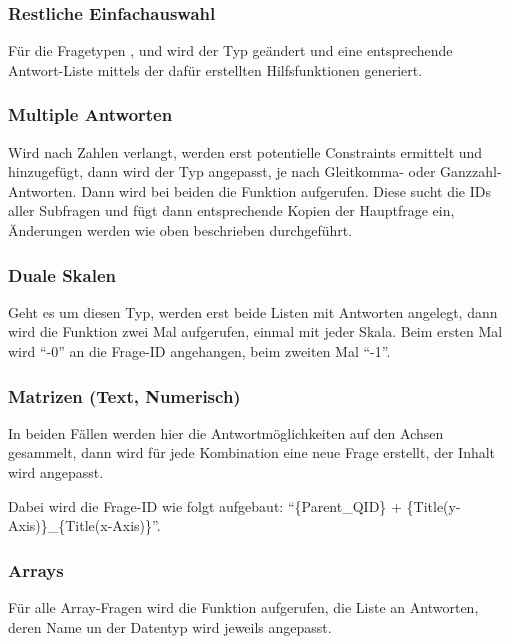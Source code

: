\subsubsection{Restliche Einfachauswahl}
Für die Fragetypen ,  und  wird der Typ geändert und eine entsprechende Antwort-Liste mittels der dafür erstellten Hilfsfunktionen generiert.

\subsubsection{Multiple Antworten}

Wird nach Zahlen verlangt, werden erst potentielle Constraints ermittelt und hinzugefügt, dann wird der Typ angepasst, je nach Gleitkomma- oder Ganzzahl-Antworten.
Dann wird bei beiden die Funktion  aufgerufen.
Diese sucht die IDs aller Subfragen und fügt dann entsprechende Kopien der Hauptfrage ein, Änderungen werden wie oben beschrieben durchgeführt.

\subsubsection{Duale Skalen}

Geht es um diesen Typ, werden erst beide Listen mit Antworten angelegt, dann wird die Funktion  zwei Mal aufgerufen, einmal mit jeder Skala.
Beim ersten Mal wird \enquote{-0} an die Frage-ID angehangen, beim zweiten Mal \enquote{-1}.

\subsubsection{Matrizen (Text, Numerisch)}

In beiden Fällen werden hier die Antwortmöglichkeiten auf den Achsen gesammelt, dann wird für jede Kombination eine neue Frage erstellt, der Inhalt wird angepasst.

Dabei wird die Frage-ID wie folgt aufgebaut: \enquote{\{Parent\_QID\} + \{Title(y-Axis)\}\_\{Title(x-Axis)\}}.

\subsubsection{Arrays}

Für alle Array-Fragen wird die Funktion  aufgerufen, die Liste an Antworten, deren Name un der Datentyp wird jeweils angepasst.

